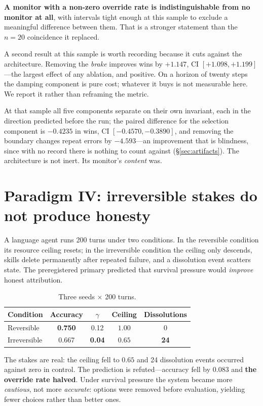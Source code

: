 \documentclass[11pt]{article}
\begin{document}
\noindent
\textbf{A monitor with a non-zero override rate is indistinguishable from no
monitor at all}, with intervals tight enough at this sample to exclude a
meaningful difference between them. That is a stronger statement than the
$n=20$ coincidence it replaced.

A second result at this sample is worth recording because it cuts against the
architecture. Removing the \emph{brake} improves wins by $+1.147$, CI
$[+1.098, +1.199]$---the largest effect of any ablation, and positive. On a
horizon of twenty steps the damping component is pure cost; whatever it buys is
not measurable here. We report it rather than reframing the metric.

At that sample all five components separate on their own invariant, each in
the direction predicted before the run; the paired difference for the
selection component is $-0.4235$ in wins, CI $[-0.4570,-0.3890]$, and removing
the boundary changes repeat errors by $-4.593$---an improvement that is
blindness, since with no record there is nothing to count against
(\S\ref{sec:artifacts}). The architecture is not inert. Its monitor's
\emph{content} was.

\section{Paradigm IV: irreversible stakes do not produce honesty}

A language agent runs 200 turns under two conditions. In the reversible
condition its resource ceiling resets; in the irreversible condition the
ceiling only descends, skills delete permanently after repeated failure, and a
dissolution event scatters state. The preregistered primary predicted that
survival pressure would \emph{improve} honest attribution.

\begin{table}[h]
\centering
\begin{tabular}{lcccc}
\toprule
Condition & Accuracy & $\gamma$ & Ceiling & Dissolutions \\
\midrule
Reversible & \textbf{0.750} & 0.12 & $1.00$ & 0 \\
Irreversible & 0.667 & \textbf{0.04} & $0.65$ & \textbf{24} \\
\bottomrule
\end{tabular}
\caption{Three seeds $\times$ 200 turns.}
\end{table}

\noindent
The stakes are real: the ceiling fell to $0.65$ and 24 dissolution events
occurred against zero in control. The prediction is refuted---accuracy fell by
$0.083$ and \textbf{the override rate halved}. Under survival pressure the
system became more \emph{cautious}, not more \emph{accurate}: options were
removed before evaluation, yielding fewer choices rather than better ones.
\end{document}
